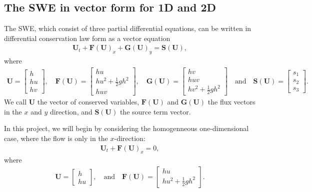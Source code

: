 \subsection{The SWE in vector form for 1D and 2D}
The SWE, which consist of three partial differential equations, can be written in differential conservation law form as a vector equation
\begin{align}
    \mathbf{U}_t + \mathbf{F(U)}_x + \mathbf{G(U)}_y = \mathbf{S(U)},
\end{align}
where 
\begin{align*}
    \mathbf{U} = \begin{bmatrix}
        h \\
        hu \\
        hv
    \end{bmatrix},
    \quad 
    \mathbf{F(U)} = \begin{bmatrix}
        hu \\
        hu^2 + \frac{1}{2}gh^2 \\
        huv
    \end{bmatrix},
    \quad
    \mathbf{G(U)} = \begin{bmatrix}
        hv \\
        huv \\
        hv^2 + \frac{1}{2}gh^2
    \end{bmatrix}
    \quad \text{and} \quad
    \mathbf{S(U)} = \begin{bmatrix}
        s_1 \\
        s_2 \\
        s_3
    \end{bmatrix}.
\end{align*}
We call $\mathbf{U}$ the vector of conserved variables, $\mathbf{F(U)}$ and $\mathbf{G(U)}$ the flux vectors in the $x$ and $y$ direction, and $\mathbf{S(U)}$ the source term vector.

In this project, we will begin by considering the homogenneous one-dimensional case, where the flow is only in the $x$-direction:
\begin{align*}
    \mathbf{U}_t + {\mathbf{F(U)}}_x = 0,
\end{align*}
where 
\begin{align*}
    \mathbf{U} = \begin{bmatrix}
        h \\
        hu
    \end{bmatrix},
    \quad
    \text{and} \quad
    \mathbf{F(U)} = \begin{bmatrix}
        hu \\
        hu^2 + \frac{1}{2}gh^2
    \end{bmatrix}.
\end{align*}

